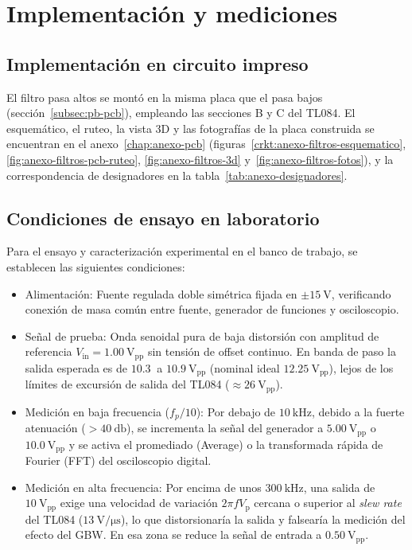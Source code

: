 \section{Implementación y mediciones}
\label{sec:pa-mediciones}

\subsection{Implementación en circuito impreso}
\label{subsec:pa-pcb}

El filtro pasa altos se montó en la misma placa que el pasa bajos (sección~\ref{subsec:pb-pcb}), empleando las
secciones B y C del TL084. El esquemático, el ruteo, la vista 3D y las fotografías de la placa construida se
encuentran en el anexo~\ref{chap:anexo-pcb} (figuras~\ref{crkt:anexo-filtros-esquematico},
\ref{fig:anexo-filtros-pcb-ruteo}, \ref{fig:anexo-filtros-3d} y~\ref{fig:anexo-filtros-fotos}), y la correspondencia de designadores en la
tabla~\ref{tab:anexo-designadores}.

\subsection{Condiciones de ensayo en laboratorio}
\label{subsec:pa-condiciones}

Para el ensayo y caracterización experimental en el banco de trabajo, se establecen las siguientes condiciones:
\begin{itemize}
  \item Alimentación: Fuente regulada doble simétrica fijada en $\pm\SI{15}{\volt}$, verificando conexión de masa
    común entre fuente, generador de funciones y osciloscopio.
  \item Señal de prueba: Onda senoidal pura de baja distorsión con amplitud de referencia
    $V_{\text{in}} = \SI{1.00}{\volt_{\text{pp}}}$ sin tensión de offset continuo. En banda de paso la salida
    esperada es de $\SI{10.3}{}$ a $\SI{10.9}{\volt_{\text{pp}}}$ (nominal ideal $\SI{12.25}{\volt_{\text{pp}}}$),
    lejos de los límites de excursión de salida del TL084 ($\approx \SI{26}{\volt_{\text{pp}}}$).
  \item Medición en baja frecuencia ($f_p/10$): Por debajo de $\SI{10}{\kilo\hertz}$, debido a la fuerte atenuación
    ($> \SI{40}{\decibel}$), se incrementa la señal del generador a $\SI{5.00}{\volt_{\text{pp}}}$ o
    $\SI{10.0}{\volt_{\text{pp}}}$ y se activa el promediado (Average) o la transformada rápida de Fourier (FFT) del
    osciloscopio digital.
  \item Medición en alta frecuencia: Por encima de unos $\SI{300}{\kilo\hertz}$, una salida de
    $\SI{10}{\volt_{\text{pp}}}$ exige una velocidad de variación $2\pi f V_{\text{p}}$ cercana o superior al
    \emph{slew rate} del TL084 ($\SI{13}{\volt/\micro\second}$), lo que distorsionaría la salida y falsearía la
    medición del efecto del GBW. En esa zona se reduce la señal de entrada a $\SI{0.50}{\volt_{\text{pp}}}$.
\end{itemize}

